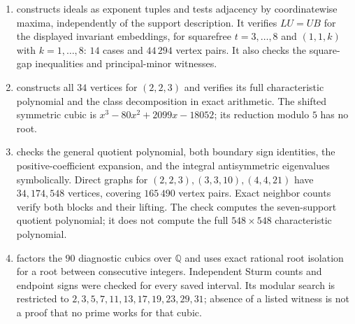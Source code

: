 \begin{enumerate}
\item {} constructs ideals
as exponent tuples and tests adjacency by coordinatewise maxima, independently
of the support description. It verifies $LU=UB$ for the displayed
invariant embeddings, for squarefree $t=3,\ldots,8$ and $(1,1,k)$ with
$k=1,\ldots,8$: $14$ cases and $44\,294$ vertex pairs. It also checks
the square-gap inequalities and principal-minor witnesses.

\item {} constructs all $34$ vertices
for $(2,2,3)$ and verifies its full characteristic polynomial and the
class decomposition in exact arithmetic. The shifted symmetric cubic is
$x^3-80x^2+2099x-18052$; its reduction modulo $5$ has no root.

\item {} checks the general
quotient polynomial, both boundary sign identities, the positive-coefficient
expansion, and the integral antisymmetric eigenvalues symbolically.
Direct graphs for $(2,2,3),(3,3,10),(4,4,21)$ have $34,174,548$ vertices,
covering $165\,490$ vertex pairs. Exact neighbor counts verify both blocks
and their lifting. The check computes the seven-support quotient polynomial;
it does not compute the full $548\times548$ characteristic polynomial.

\item {} factors the $90$ diagnostic cubics
over $\mathbb Q$ and uses exact rational root isolation for a root between
consecutive integers. Independent Sturm counts and endpoint signs were
checked for every saved interval. Its modular search is restricted to
$2,3,5,7,11,13,17,19,23,29,31$; absence of a listed witness is not a proof
that no prime works for that cubic.


\end{enumerate}
